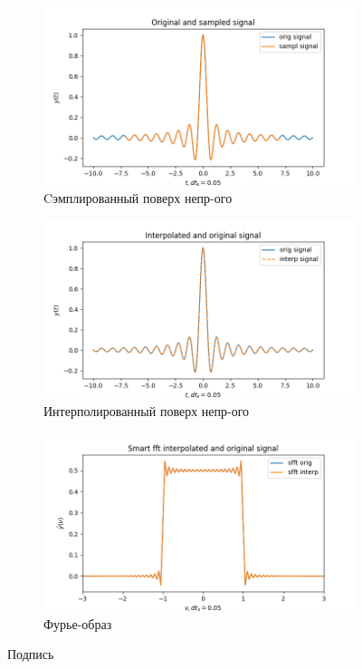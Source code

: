 \documentclass[a4paper, 12pt]{article}
\begin{document}
    \begin{figure}[H]
        \centering
        \begin{subfigure}{0.45\textwidth}
            \centering
            \includegraphics[width=\linewidth]{3_sinc.png}
            \caption{Cэмплированный поверх непр-ого}
            \label{fig:sinc3}
        \end{subfigure}
        \hspace{5mm}
        \begin{subfigure}{0.45\textwidth}
            \centering
            \includegraphics[width=\linewidth]{3_isinc.png}
            \caption{Интерполированный поверх непр-ого}
            \label{fig:isinc3}
        \end{subfigure}
        \begin{subfigure}{0.45\textwidth}
            \centering
            \includegraphics[width=\linewidth]{3_fsinc.png}
            \caption{Фурье-образ}
            \label{fig:fisinc3}
        \end{subfigure}
        \caption{Подпись}
        \label{fig:sincs3}
    \end{figure}
\end{document}
